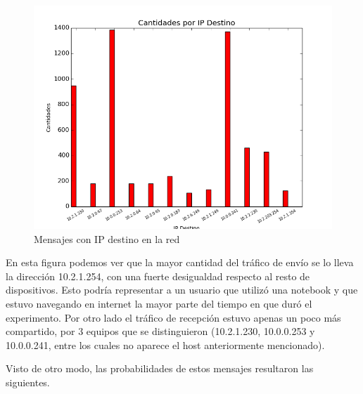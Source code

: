 \begin{figure}[h!]
\centering
\includegraphics[width=0.7\linewidth]{imagenes/exp2/5v2CantidadesIPDestino100}
\caption{Mensajes con IP destino en la red}
\label{exp1grafico1}
\end{figure}


En esta figura podemos ver que la mayor cantidad del tr\'afico de env\'io se lo lleva la direcci\'on 10.2.1.254, con una fuerte desigualdad respecto al resto de dispositivos. Esto podr\'ia representar a un usuario que utiliz\'o una notebook y que estuvo navegando en internet la mayor parte del tiempo en que dur\'o el experimento. Por otro lado el tr\'afico de recepci\'on estuvo apenas un poco m\'as compartido, por 3 equipos que se distinguieron (10.2.1.230, 10.0.0.253 y 10.0.0.241, entre los cuales no aparece el host anteriormente mencionado).

\newpage
Visto de otro modo, las probabilidades de estos mensajes resultaron las siguientes.

